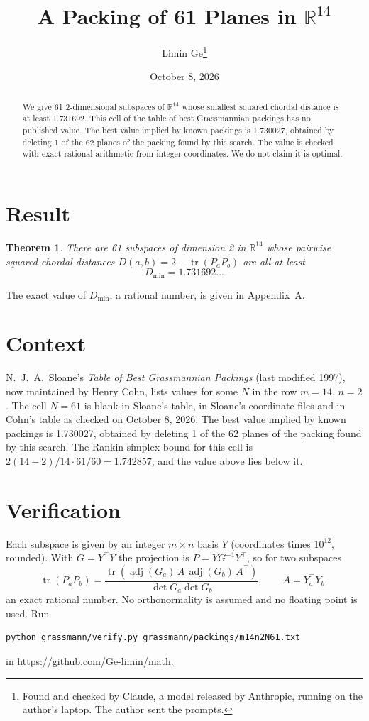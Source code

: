 \documentclass[11pt,a4paper]{article}
\title{A Packing of 61 Planes in $\mathbb{R}^{14}$}
\author{Limin Ge\thanks{Found and checked by Claude, a model released by Anthropic, running on the author's laptop. The author sent the prompts.}}
\date{October 8, 2026}
\newtheorem*{theorem}{Theorem}
\begin{document}
\maketitle
\begin{abstract}
We give 61 2-dimensional subspaces of $\mathbb{R}^{14}$ whose smallest squared chordal distance is at least 1.731692. This cell of the table of best Grassmannian packings has no published value. The best value implied by known packings is 1.730027, obtained by deleting 1 of the 62 planes of the packing found by this search. The value is checked with exact rational arithmetic from integer coordinates. We do not claim it is optimal.
\end{abstract}

\section{Result}
\begin{theorem}
There are 61 subspaces of dimension 2 in $\mathbb{R}^{14}$ whose pairwise squared chordal distances $D(a,b) = 2 - \operatorname{tr}(P_aP_b)$ are all at least
\[ D_{\min} = 1.731692\ldots \]
\end{theorem}
The exact value of $D_{\min}$, a rational number, is given in Appendix~A.


\section{Context}
N.~J.~A.~Sloane's \emph{Table of Best Grassmannian Packings} (last modified 1997), now maintained by Henry Cohn, lists values for some $N$ in the row $m=14$, $n=2$. The cell $N=61$ is blank in Sloane's table, in Sloane's coordinate files and in Cohn's table as checked on October 8, 2026. The best value implied by known packings is 1.730027, obtained by deleting 1 of the 62 planes of the packing found by this search. The Rankin simplex bound for this cell is $2(14-2)/14\cdot 61/60 = 1.742857$, and the value above lies below it.


\section{Verification}
Each subspace is given by an integer $m\times n$ basis $Y$ (coordinates times $10^{12}$, rounded). With $G=Y^\top Y$ the projection is $P=YG^{-1}Y^\top$, so for two subspaces
\[ \operatorname{tr}(P_aP_b)=\frac{\operatorname{tr}(\operatorname{adj}(G_a)\,A\,\operatorname{adj}(G_b)\,A^\top)}{\det G_a\det G_b},\qquad A=Y_a^\top Y_b, \]
an exact rational number. No orthonormality is assumed and no floating point is used. Run
\begin{verbatim}
python grassmann/verify.py grassmann/packings/m14n2N61.txt
\end{verbatim}
in \url{https://github.com/Ge-limin/math}.
\end{document}

